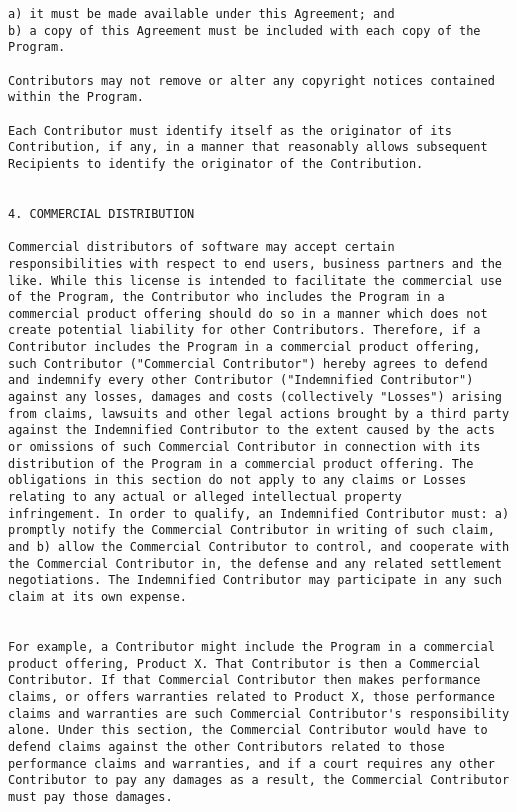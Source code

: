 \begin{verbatim}
a) it must be made available under this Agreement; and 
b) a copy of this Agreement must be included with each copy of the Program. 

Contributors may not remove or alter any copyright notices contained
within the Program.  

Each Contributor must identify itself as the originator of its
Contribution, if any, in a manner that reasonably allows subsequent
Recipients to identify the originator of the Contribution.  


4. COMMERCIAL DISTRIBUTION 

Commercial distributors of software may accept certain
responsibilities with respect to end users, business partners and the
like. While this license is intended to facilitate the commercial use
of the Program, the Contributor who includes the Program in a
commercial product offering should do so in a manner which does not
create potential liability for other Contributors. Therefore, if a
Contributor includes the Program in a commercial product offering,
such Contributor ("Commercial Contributor") hereby agrees to defend
and indemnify every other Contributor ("Indemnified Contributor")
against any losses, damages and costs (collectively "Losses") arising
from claims, lawsuits and other legal actions brought by a third party
against the Indemnified Contributor to the extent caused by the acts
or omissions of such Commercial Contributor in connection with its
distribution of the Program in a commercial product offering. The
obligations in this section do not apply to any claims or Losses
relating to any actual or alleged intellectual property
infringement. In order to qualify, an Indemnified Contributor must: a)
promptly notify the Commercial Contributor in writing of such claim,
and b) allow the Commercial Contributor to control, and cooperate with
the Commercial Contributor in, the defense and any related settlement
negotiations. The Indemnified Contributor may participate in any such
claim at its own expense.  


For example, a Contributor might include the Program in a commercial
product offering, Product X. That Contributor is then a Commercial
Contributor. If that Commercial Contributor then makes performance
claims, or offers warranties related to Product X, those performance
claims and warranties are such Commercial Contributor's responsibility
alone. Under this section, the Commercial Contributor would have to
defend claims against the other Contributors related to those
performance claims and warranties, and if a court requires any other
Contributor to pay any damages as a result, the Commercial Contributor
must pay those damages.  



\end{verbatim}
